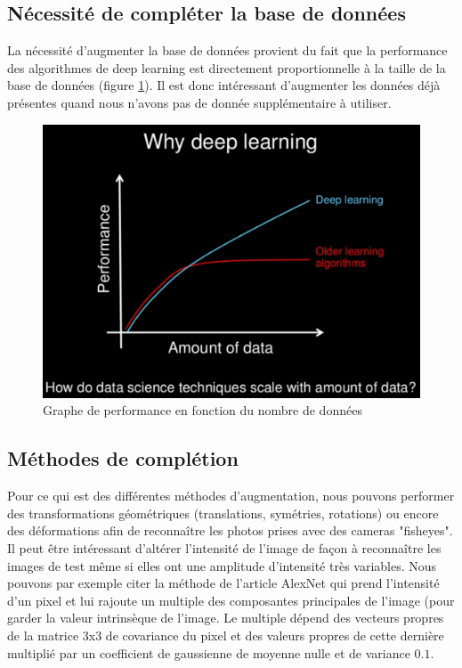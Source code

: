 \documentclass[a4paper,11pt]{article}
\begin{document}
    \subsection{Nécessité de compléter la base de données}

	La nécessité d'augmenter la base de données provient du fait que la performance des
	algorithmes de deep learning est directement proportionnelle à la taille de la base de
	données (figure \ref{fig:data1}). Il est donc intéressant d'augmenter les données déjà présentes quand nous n'avons pas de donnée supplémentaire à utiliser.

	\begin{figure}[H]
	    \centering
	    \includegraphics[scale=0.3]{deeplearning_data.png}
	    \caption{Graphe de performance en fonction du nombre de données}
	    \label{fig:data1}
	\end{figure}

    \subsection{Méthodes de complétion}

	Pour ce qui est des différentes méthodes d'augmentation, nous pouvons performer des
	transformations géométriques (translations, symétries, rotations) ou encore des
	déformations afin de reconnaître les photos prises avec des cameras "fisheyes".\\

	Il peut être intéressant d'altérer l'intensité de l'image de façon à reconnaître les images
	de test même si elles ont une amplitude d'intensité très variables. Nous pouvons par exemple
	citer la méthode de l'article AlexNet \cite{alexnet} qui prend l'intensité d'un pixel et lui
	rajoute un multiple des composantes principales de l'image (pour garder la valeur
	intrinsèque de l'image. Le multiple dépend des vecteurs propres de la matrice 3x3 de
	covariance du pixel et des valeurs propres de cette dernière multiplié par un coefficient
	de gaussienne de moyenne nulle et de variance $0.1$.\\
\end{document}
